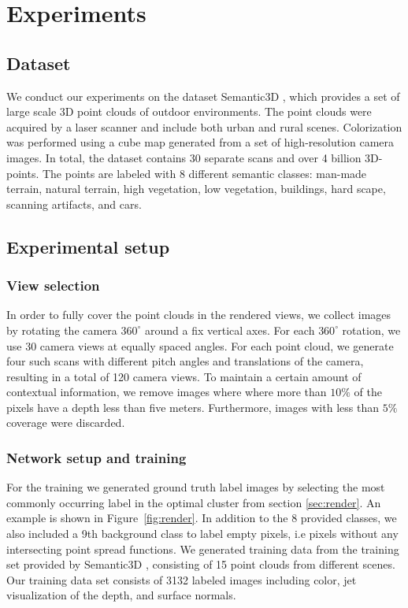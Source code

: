 \documentclass[runningheads,a4paper]{llncs}
\begin{document}
\section{Experiments}

\subsection{Dataset}
We conduct our experiments on the dataset Semantic3D \cite{hackel2017semantic3d}, which provides a set of large scale 3D point clouds of outdoor environments. The point clouds were acquired by a laser scanner and include both urban and rural scenes. Colorization was performed using a cube map generated from a set of high-resolution camera images. In total, the dataset contains 30 separate scans and over 4 billion 3D-points. The points are labeled with 8 different semantic classes: man-made terrain, natural terrain, high vegetation, low vegetation, buildings, hard scape, scanning artifacts, and cars. 

 
\subsection{Experimental setup}

\subsubsection{View selection}
In order to fully cover the point clouds in the rendered views, we collect images by rotating the camera $360^\circ$ around a fix vertical axes. For each $360^\circ$ rotation, we use 30 camera views at equally spaced angles. For each point cloud, we generate four such scans with different pitch angles and translations of the camera, resulting in a total of 120 camera views. To maintain a certain amount of contextual information, we remove images where where more than $10\%$ of the pixels have a depth less than five meters. Furthermore, images with less than $5\%$ coverage were discarded.


\subsubsection{Network setup and training}
For the training we generated ground truth label images by selecting the most commonly occurring label in the optimal cluster from section \ref{sec:render}. An example is shown in Figure~\ref{fig:render}. In addition to the 8 provided classes, we also included a 9th background class to label empty pixels, i.e pixels without any intersecting point spread functions. We generated training data from the training set provided by Semantic3D \cite{hackel2017semantic3d}, consisting of 15 point clouds from different scenes. Our training data set consists of 3132 labeled images including color, jet visualization of the depth, and surface normals. 
\end{document}
